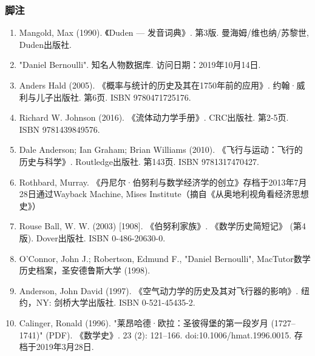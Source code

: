 \subsubsection{脚注}  
\begin{enumerate}
\item Mangold, Max (1990). 《Duden — 发音词典》. 第3版. 曼海姆/维也纳/苏黎世, Duden出版社.  
\item "Daniel Bernoulli". 知名人物数据库. 访问日期：2019年10月14日.  
\item Anders Hald (2005). 《概率与统计的历史及其在1750年前的应用》. 约翰·威利与儿子出版社. 第6页. ISBN 9780471725176.  
\item Richard W. Johnson (2016). 《流体动力学手册》. CRC出版社. 第2-5页. ISBN 9781439849576.  
\item Dale Anderson; Ian Graham; Brian Williams (2010). 《飞行与运动：飞行的历史与科学》. Routledge出版社. 第143页. ISBN 9781317470427.  
\item Rothbard, Murray. 《丹尼尔·伯努利与数学经济学的创立》存档于2013年7月28日通过Wayback Machine, Mises Institute（摘自《从奥地利视角看经济思想史》）  
\item Rouse Ball, W. W. (2003) [1908]. 《伯努利家族》. 《数学历史简短记》 (第4版). Dover出版社. ISBN 0-486-20630-0.  
\item O'Connor, John J.; Robertson, Edmund F., "Daniel Bernoulli", MacTutor数学历史档案，圣安德鲁斯大学 (1998).  
\item Anderson, John David (1997). 《空气动力学的历史及其对飞行器的影响》. 纽约，NY: 剑桥大学出版社. ISBN 0-521-45435-2.  
\item Calinger, Ronald (1996). "莱昂哈德·欧拉：圣彼得堡的第一段岁月 (1727–1741)" (PDF). 《数学史》. 23 (2): 121–166. doi:10.1006/hmat.1996.0015. 存档于2019年3月28日.
\end{enumerate}